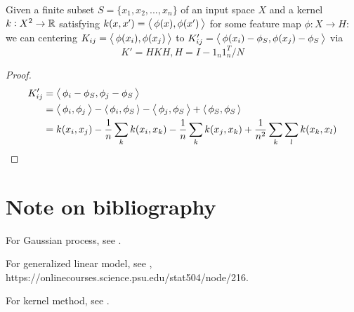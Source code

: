 \begin{refsection}
\begin{lemma}
	\cite[496]{murphy2012machine}\cite[115]{shawe2004kernel}Given a finite subset $S=\{x_1,x_2,...,x_n\}$ of an input space $X$ and a kernel $k:X^2\to \mathbb{R}$ satisfying $k(x,x')={\left< \, \phi(x),\phi(x') \, \right>}$ for some feature map $\phi:X\to H$: we can centering $K_{ij} = {\left< \, \phi(x_i),\phi(x_j) \, \right>}$ to $K'_{ij} = {\left< \, \phi(x_i) - \phi_S,\phi(x_j)-\phi_S \, \right>}$ via
	$$K' = HKH,H = I-1_n1_n^T/N$$
\end{lemma}
\begin{proof}
	\begin{align*}
	K'_{ij} &= {\left< \, \phi_i - \phi_S,\phi_j-\phi_S \, \right>} \\
	&= {\left< \, \phi_i,\phi_j \, \right>} - {\left< \, \phi_i,\phi_S \, \right>} - {\left< \, \phi_j,\phi_S \, \right>} + {\left< \, \phi_S,\phi_S \, \right>}\\
	&= k(x_i,x_j) - \frac{1}{n}\sum_k k(x_i,x_k) - \frac{1}{n} \sum_k k(x_j,x_k) + \frac{1}{n^2}\sum_k \sum_l k(x_k,x_l)
	\end{align*}	
\end{proof}


\section{Note on bibliography}

For Gaussian process, see \cite{rasmussen2006gaussian}.


For generalized linear model, see \cite{dobson2008introduction}, https://onlinecourses.science.psu.edu/stat504/node/216.


For kernel method, see \cite{shawe2004kernel}.



\end{refsection}
